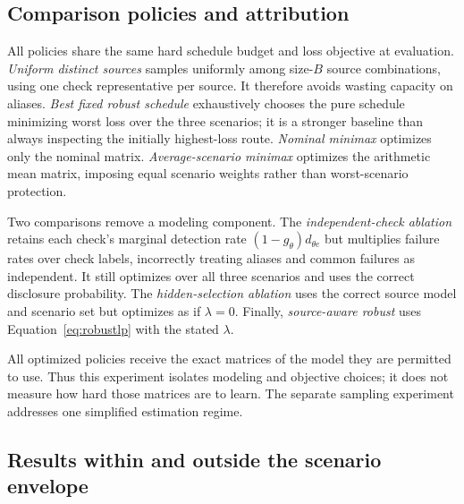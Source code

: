 \documentclass[11pt,letterpaper]{article}
\begin{document}
\subsection{Comparison policies and attribution}

All policies share the same hard schedule budget and loss objective at evaluation. \emph{Uniform distinct sources} samples uniformly among size-$B$ source combinations, using one check representative per source. It therefore avoids wasting capacity on aliases. \emph{Best fixed robust schedule} exhaustively chooses the pure schedule minimizing worst loss over the three scenarios; it is a stronger baseline than always inspecting the initially highest-loss route. \emph{Nominal minimax} optimizes only the nominal matrix. \emph{Average-scenario minimax} optimizes the arithmetic mean matrix, imposing equal scenario weights rather than worst-scenario protection.

Two comparisons remove a modeling component. The \emph{independent-check ablation} retains each check's marginal detection rate $(1-g_\theta)d_{\theta e}$ but multiplies failure rates over check labels, incorrectly treating aliases and common failures as independent. It still optimizes over all three scenarios and uses the correct disclosure probability. The \emph{hidden-selection ablation} uses the correct source model and scenario set but optimizes as if $\lambda=0$. Finally, \emph{source-aware robust} uses Equation~\ref{eq:robustlp} with the stated $\lambda$.

All optimized policies receive the exact matrices of the model they are permitted to use. Thus this experiment isolates modeling and objective choices; it does not measure how hard those matrices are to learn. The separate sampling experiment addresses one simplified estimation regime.

\subsection{Results within and outside the scenario envelope}

\begin{table}[htbp]
\centering\small
\caption{Results over 600 synthetic settings. Envelope and Outside are mean losses divided by the largest route loss within each setting. Median gap and 95th gap are the median and 95th percentile of excess loss over the robust optimum, in unnormalized assumed units. Outside uses the omitted adverse scenario.}
\label{tab:results}

\end{table}
\end{document}
